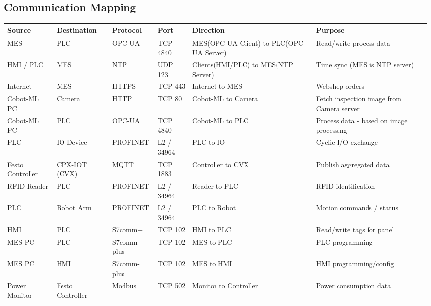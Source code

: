 \documentclass[11pt,a4paper]{article}
\begin{document}
\subsection{Communication Mapping}
{\small
\setlength{\tabcolsep}{4pt}
\begin{longtable}{L{2.6cm} L{2.0cm} L{1.8cm} L{1.8cm} L{3.4cm} L{3.2cm}}
\toprule
\textbf{Source} & \textbf{Destination} & \textbf{Protocol} & \textbf{Port} & \textbf{Direction} & \textbf{Purpose} \\
\midrule \endhead
    MES & PLC & OPC-UA & TCP 4840 & MES(OPC-UA Client) to
    PLC(OPC-UA Server) & Read/write process data \\ 

    HMI / PLC & MES & NTP & UDP 123 &
    Clients(HMI/PLC) to MES(NTP Server) & Time sync (MES is NTP server) \\

    Internet & MES & HTTPS & TCP 443 & Internet to MES &
    Webshop orders \\ 

    Cobot-ML PC & Camera & HTTP & TCP 80 & Cobot-ML to
    Camera & Fetch inspection image from Camera server \\ 

    Cobot-ML PC & PLC & OPC-UA & TCP 4840 & Cobot-ML to PLC & 
    Process data - based on image processing \\

    PLC & IO Device & PROFINET &
    L2 / 34964 & PLC to IO & Cyclic I/O exchange \\ 

    Festo Controller & CPX-IOT (CVX) & MQTT & TCP 1883 &
    Controller to CVX & Publish aggregated data \\ 

    RFID Reader & PLC & PROFINET & L2 / 34964 & Reader to PLC &
    RFID identification \\ 

    PLC & Robot Arm & PROFINET & L2 /
    34964 & PLC to Robot & Motion commands / status \\ 

    HMI & PLC & S7comm+ & TCP 102 & HMI to PLC & Read/write
    tags for panel \\ 

    MES PC & PLC & S7comm-plus & TCP 102 & MES to PLC & PLC programming \\ 

    MES PC & HMI & S7comm-plus & TCP 102 & MES to HMI & HMI
    programming/config \\ 

    Power Monitor & Festo Controller & Modbus & TCP 502
    & Monitor to Controller & Power consumption data \\
\bottomrule
\end{longtable}
}
\end{document}
